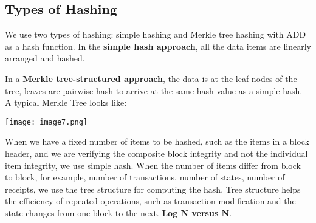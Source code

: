 \documentclass{article}
\begin{document}
\subsection{Types of Hashing}
We use two types of hashing: simple hashing and Merkle tree hashing with ADD as a hash function.
In the \textbf{simple hash approach}, all the data items are linearly arranged and hashed. \par In a \textbf{Merkle tree-structured approach}, the data is at the leaf nodes of the tree, leaves are pairwise hash to arrive at the same hash value as a simple hash. A typical Merkle Tree looks like:
\begin{center}
    \texttt{[image: image7.png]}
\end{center}
When we have a fixed number of items to be hashed, such as the items in a block header, and we are verifying the composite block integrity and not the individual item integrity, we use simple hash. When the number of items differ from block to block, for example, number of transactions, number of states, number of receipts, we use the tree structure for computing the hash. Tree structure helps the efficiency of repeated operations, such as transaction modification and the state changes from one block to the next. \textbf{Log N versus N}.
\end{document}
